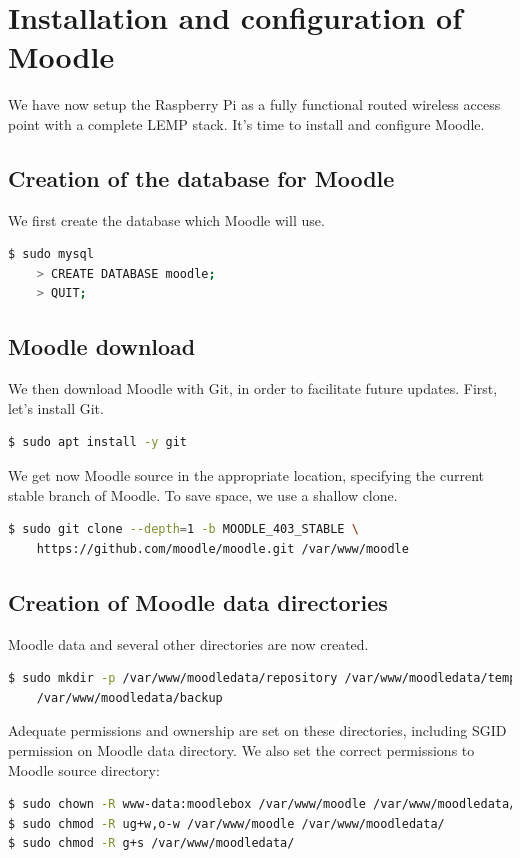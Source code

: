 \documentclass[12pt]{article}
\begin{document}
\section{Installation and configuration of Moodle}

We have now setup the Raspberry Pi as a fully functional routed wireless access point with a complete LEMP stack.
It's time to install and configure Moodle.

\subsection{Creation of the database for Moodle}

We first create the database which Moodle will use.
\begin{lstlisting}[language=bash]
$ sudo mysql
    > CREATE DATABASE moodle;
    > QUIT;
\end{lstlisting}

\subsection{Moodle download}

We then download Moodle with Git, in order to facilitate future updates.
First, let's install Git.
\begin{lstlisting}[language=bash]
$ sudo apt install -y git
\end{lstlisting}

We get now Moodle source in the appropriate location, specifying the current stable branch of Moodle.
To save space, we use a shallow clone.
\begin{lstlisting}[language=bash]
$ sudo git clone --depth=1 -b MOODLE_403_STABLE \
    https://github.com/moodle/moodle.git /var/www/moodle
\end{lstlisting}

\subsection{Creation of Moodle data directories}

Moodle data and several other directories are now created.
\begin{lstlisting}[language=bash]
$ sudo mkdir -p /var/www/moodledata/repository /var/www/moodledata/temp \
    /var/www/moodledata/backup
\end{lstlisting}
Adequate permissions and ownership are set on these directories, including SGID permission on Moodle data directory.
We also set the correct permissions to Moodle source directory:
\begin{lstlisting}[language=bash]
$ sudo chown -R www-data:moodlebox /var/www/moodle /var/www/moodledata/
$ sudo chmod -R ug+w,o-w /var/www/moodle /var/www/moodledata/
$ sudo chmod -R g+s /var/www/moodledata/
\end{lstlisting}
\end{document}
